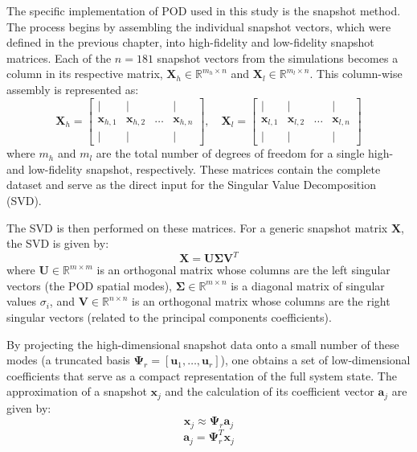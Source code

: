\documentclass[tg, EN]{ufabcFHZh_tg}
\begin{document}
The specific implementation of POD used in this study is the snapshot method. The process begins by assembling the individual snapshot vectors, which were defined in the previous chapter, into high-fidelity and low-fidelity snapshot matrices. Each of the $n=181$ snapshot vectors from the simulations becomes a column in its respective matrix, $\mathbf{X}_h \in \mathbb{R}^{m_h \times n}$ and $\mathbf{X}_l \in \mathbb{R}^{m_l \times n}$. This column-wise assembly is represented as:
\begin{equation}
    \mathbf{X}_h = 
    \begin{bmatrix}
        | & | & & | \\
        \mathbf{x}_{h,1} & \mathbf{x}_{h,2} & \dots & \mathbf{x}_{h,n} \\
        | & | & & |
    \end{bmatrix}
    , \quad
    \mathbf{X}_l = 
    \begin{bmatrix}
        | & | & & | \\
        \mathbf{x}_{l,1} & \mathbf{x}_{l,2} & \dots & \mathbf{x}_{l,n} \\
        | & | & & |
    \end{bmatrix}
    \label{eq:snapshot_matrix}
\end{equation}
where $m_h$ and $m_l$ are the total number of degrees of freedom for a single high- and low-fidelity snapshot, respectively. These matrices contain the complete dataset and serve as the direct input for the Singular Value Decomposition (SVD).

The SVD is then performed on these matrices. For a generic snapshot matrix $\mathbf{X}$, the SVD is given by:
\begin{equation}
\mathbf{X} = \mathbf{U} \mathbf{\Sigma} \mathbf{V}^T
\end{equation}
where $\mathbf{U} \in \mathbb{R}^{m \times m}$ is an orthogonal matrix whose columns are the left singular vectors (the POD spatial modes), $\mathbf{\Sigma} \in \mathbb{R}^{m \times n}$ is a diagonal matrix of singular values $\sigma_i$, and $\mathbf{V} \in \mathbb{R}^{n \times n}$ is an orthogonal matrix whose columns are the right singular vectors (related to the principal components coefficients).

By projecting the high-dimensional snapshot data onto a small number of these modes (a truncated basis $\mathbf{\Psi}_r = [\mathbf{u}_1, \dots, \mathbf{u}_r]$), one obtains a set of low-dimensional coefficients that serve as a compact representation of the full system state. The approximation of a snapshot $\mathbf{x}_j$ and the calculation of its coefficient vector $\mathbf{a}_j$ are given by:
\begin{equation}
\mathbf{x}_j \approx \mathbf{\Psi}_r \mathbf{a}_j
\end{equation}
\begin{equation}
\mathbf{a}_j = \mathbf{\Psi}_r^T \mathbf{x}_j
\end{equation}
\end{document}

